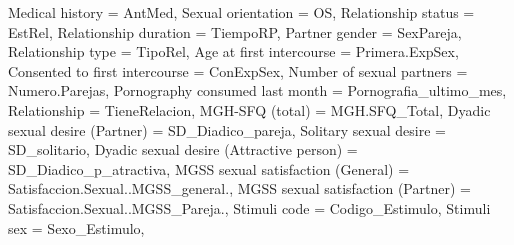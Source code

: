 \documentclass[
  bookmarksnumbered]{article}
\newenvironment{Shaded}{\begin{snugshade}}{\end{snugshade}}
\newcommand{\AttributeTok}[1]{\textcolor[rgb]{0.80,0.80,0.80}{#1}}
\newcommand{\NormalTok}[1]{\textcolor[rgb]{0.80,0.80,0.80}{#1}}
\newcommand{\OtherTok}[1]{\textcolor[rgb]{0.94,0.94,0.56}{#1}}
\newcommand{\StringTok}[1]{\textcolor[rgb]{0.80,0.58,0.58}{#1}}
\begin{document}
\begin{Shaded}
\begin{Highlighting}[]
         \StringTok{\textasciigrave{}}\AttributeTok{Medical history}\StringTok{\textasciigrave{}} \OtherTok{=}\NormalTok{ AntMed,}
         \StringTok{\textasciigrave{}}\AttributeTok{Sexual orientation}\StringTok{\textasciigrave{}} \OtherTok{=}\NormalTok{ OS,}
         \StringTok{\textasciigrave{}}\AttributeTok{Relationship status}\StringTok{\textasciigrave{}} \OtherTok{=}\NormalTok{ EstRel,}
         \StringTok{\textasciigrave{}}\AttributeTok{Relationship duration}\StringTok{\textasciigrave{}} \OtherTok{=}\NormalTok{ TiempoRP,}
         \StringTok{\textasciigrave{}}\AttributeTok{Partner gender}\StringTok{\textasciigrave{}} \OtherTok{=}\NormalTok{ SexPareja,}
         \StringTok{\textasciigrave{}}\AttributeTok{Relationship type}\StringTok{\textasciigrave{}} \OtherTok{=}\NormalTok{ TipoRel,}
         \StringTok{\textasciigrave{}}\AttributeTok{Age at first intercourse}\StringTok{\textasciigrave{}} \OtherTok{=}\NormalTok{ Primera.ExpSex,}
         \StringTok{\textasciigrave{}}\AttributeTok{Consented to first intercourse}\StringTok{\textasciigrave{}} \OtherTok{=}\NormalTok{ ConExpSex,}
         \StringTok{\textasciigrave{}}\AttributeTok{Number of sexual partners}\StringTok{\textasciigrave{}} \OtherTok{=}\NormalTok{ Numero.Parejas,}
         \StringTok{\textasciigrave{}}\AttributeTok{Pornography consumed last month}\StringTok{\textasciigrave{}} \OtherTok{=}\NormalTok{ Pornografia\_ultimo\_mes,}
         \AttributeTok{Relationship =}\NormalTok{ TieneRelacion,}
         \StringTok{\textasciigrave{}}\AttributeTok{MGH{-}SFQ (total)}\StringTok{\textasciigrave{}} \OtherTok{=}\NormalTok{ MGH.SFQ\_Total,}
         \StringTok{\textasciigrave{}}\AttributeTok{Dyadic sexual desire (Partner)}\StringTok{\textasciigrave{}} \OtherTok{=}\NormalTok{ SD\_Diadico\_pareja,}
         \StringTok{\textasciigrave{}}\AttributeTok{Solitary sexual desire}\StringTok{\textasciigrave{}} \OtherTok{=}\NormalTok{ SD\_solitario,}
         \StringTok{\textasciigrave{}}\AttributeTok{Dyadic sexual desire (Attractive person)}\StringTok{\textasciigrave{}} \OtherTok{=}\NormalTok{ SD\_Diadico\_p\_atractiva,}
         \StringTok{\textasciigrave{}}\AttributeTok{MGSS sexual satisfaction (General)}\StringTok{\textasciigrave{}} \OtherTok{=}\NormalTok{ Satisfaccion.Sexual..MGSS\_general.,}
         \StringTok{\textasciigrave{}}\AttributeTok{MGSS sexual satisfaction (Partner)}\StringTok{\textasciigrave{}} \OtherTok{=}\NormalTok{ Satisfaccion.Sexual..MGSS\_Pareja.,}
         \StringTok{\textasciigrave{}}\AttributeTok{Stimuli code}\StringTok{\textasciigrave{}} \OtherTok{=}\NormalTok{ Codigo\_Estimulo,}
         \StringTok{\textasciigrave{}}\AttributeTok{Stimuli sex}\StringTok{\textasciigrave{}} \OtherTok{=}\NormalTok{ Sexo\_Estimulo,}

\end{Highlighting}
\end{Shaded}
\end{document}
